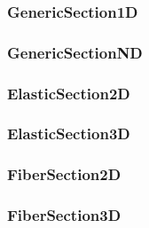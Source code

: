 \pagebreak \subsubsection{GenericSection1D}


\pagebreak \subsubsection{GenericSectionND}


\pagebreak \subsubsection{ElasticSection2D}


\pagebreak \subsubsection{ElasticSection3D}


\pagebreak \subsubsection{FiberSection2D}


\pagebreak \subsubsection{FiberSection3D}


\pagebreak

